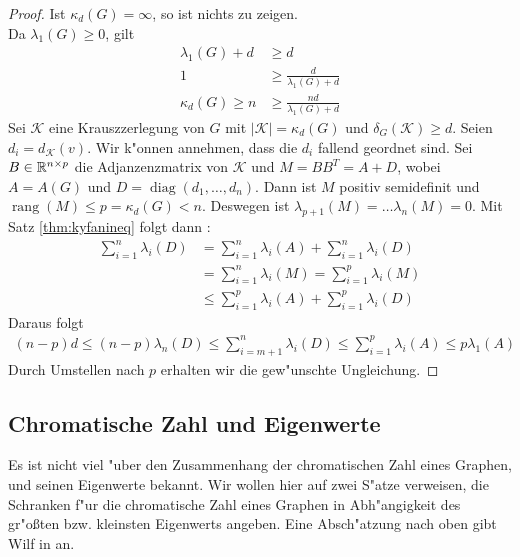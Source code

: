 \begin{proof}
  Ist $\kappa_{d}(G) = \infty$, so ist nichts zu zeigen. \\
   Da $\lambda_{1}(G) \geq 0$, gilt 
  \begin{align*}
    \lambda_{1}(G) + d &\geq d \\
    1 &\geq \frac{d}{\lambda_{1}(G) + d }\\
    \kappa_{d}(G) \geq n &\geq \frac{nd}{\lambda_{1}(G)+d}
  \end{align*}
  Sei $\mathcal{K}$ eine Krauszzerlegung von $G$ mit $|\mathcal{K}| = \kappa_{d}(G)$ und $\delta_{G}(\mathcal{K}) \geq d$. Seien $d_{i} = d_{\mathcal{K}}(v)$. Wir k"onnen annehmen, dass die $d_{i}$ fallend geordnet sind. Sei $B\in {\mathbb{R}}^{n\times p}$ die Adjanzenzmatrix von $\mathcal{K}$ und $M = BB^{T} = A+D$, wobei $A= A(G)$ und $D = \operatorname{diag}(d_{1},\dots,d_n)$.
  Dann ist $M$ positiv semidefinit und $\operatorname{rang} (M) \leq p = \kappa_{d}(G) < n $. Deswegen ist $\lambda_{p+1}(M) = \dots \lambda_{n}(M) = 0$. 
  Mit Satz \ref{thm:kyfanineq} folgt dann : 
  \begin{align*}
    \sum\limits_{i=1}^{n} \lambda_{i}(D) &=\sum\limits_{i=1}^{n} \lambda_{i}(A) +\sum\limits_{i=1}^{n}  \lambda_{i}(D) \\
    &=\sum\limits_{i=1}^{n} \lambda_{i}(M) =\sum\limits_{i=1}^{p} \lambda_{i}(M) \\
    &\leq \sum\limits_{i=1}^{p} \lambda_{i}(A) +\sum\limits_{i=1}^{p} \lambda_{i}(D)
  \end{align*}
  Daraus folgt 
  \begin{align*}
    (n-p) d \leq (n-p) \lambda_n(D) \leq \sum\limits_{i=m+1}^{n} \lambda_{i}(D) \leq\sum\limits_{i=1}^{p} \lambda_{i}(A) \leq p\lambda_{1}(A)
  \end{align*}
  Durch Umstellen nach $p$ erhalten wir die gew"unschte Ungleichung.
\end{proof}

\subsection{Chromatische Zahl und Eigenwerte}
Es ist nicht viel "uber den Zusammenhang der chromatischen Zahl eines Graphen, und seinen Eigenwerte bekannt. Wir wollen hier auf zwei S"atze verweisen, die Schranken f"ur die chromatische Zahl eines Graphen in Abh"angigkeit des gr"o{\ss}ten bzw. kleinsten Eigenwerts angeben. Eine Absch"atzung nach oben  gibt Wilf in \cite{Wilf67} an.

